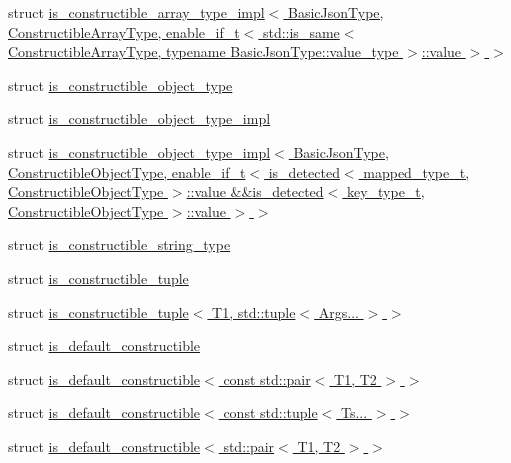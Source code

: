 \begin{DoxyCompactItemize}
\item 
struct \hyperlink{structnlohmann_1_1detail_1_1is__constructible__array__type__impl_3_01BasicJsonType_00_01Construce6fa33688da703b95649da4749cdeb98}{is\+\_\+constructible\+\_\+array\+\_\+type\+\_\+impl$<$ Basic\+Json\+Type, Constructible\+Array\+Type, enable\+\_\+if\+\_\+t$<$ std\+::is\+\_\+same$<$ Constructible\+Array\+Type, typename Basic\+Json\+Type\+::value\+\_\+type $>$\+::value $>$ $>$}
\item 
struct \hyperlink{structnlohmann_1_1detail_1_1is__constructible__object__type}{is\+\_\+constructible\+\_\+object\+\_\+type}
\item 
struct \hyperlink{structnlohmann_1_1detail_1_1is__constructible__object__type__impl}{is\+\_\+constructible\+\_\+object\+\_\+type\+\_\+impl}
\item 
struct \hyperlink{structnlohmann_1_1detail_1_1is__constructible__object__type__impl_3_01BasicJsonType_00_01Construa4d1e16800f2c4963485512ecf18377c}{is\+\_\+constructible\+\_\+object\+\_\+type\+\_\+impl$<$ Basic\+Json\+Type, Constructible\+Object\+Type, enable\+\_\+if\+\_\+t$<$ is\+\_\+detected$<$ mapped\+\_\+type\+\_\+t, Constructible\+Object\+Type $>$\+::value \&\&is\+\_\+detected$<$ key\+\_\+type\+\_\+t, Constructible\+Object\+Type $>$\+::value $>$ $>$}
\item 
struct \hyperlink{structnlohmann_1_1detail_1_1is__constructible__string__type}{is\+\_\+constructible\+\_\+string\+\_\+type}
\item 
struct \hyperlink{structnlohmann_1_1detail_1_1is__constructible__tuple}{is\+\_\+constructible\+\_\+tuple}
\item 
struct \hyperlink{structnlohmann_1_1detail_1_1is__constructible__tuple_3_01T1_00_01std_1_1tuple_3_01Args_8_8_8_01_4_01_4}{is\+\_\+constructible\+\_\+tuple$<$ T1, std\+::tuple$<$ Args... $>$ $>$}
\item 
struct \hyperlink{structnlohmann_1_1detail_1_1is__default__constructible}{is\+\_\+default\+\_\+constructible}
\item 
struct \hyperlink{structnlohmann_1_1detail_1_1is__default__constructible_3_01const_01std_1_1pair_3_01T1_00_01T2_01_4_01_4}{is\+\_\+default\+\_\+constructible$<$ const std\+::pair$<$ T1, T2 $>$ $>$}
\item 
struct \hyperlink{structnlohmann_1_1detail_1_1is__default__constructible_3_01const_01std_1_1tuple_3_01Ts_8_8_8_01_4_01_4}{is\+\_\+default\+\_\+constructible$<$ const std\+::tuple$<$ Ts... $>$ $>$}
\item 
struct \hyperlink{structnlohmann_1_1detail_1_1is__default__constructible_3_01std_1_1pair_3_01T1_00_01T2_01_4_01_4}{is\+\_\+default\+\_\+constructible$<$ std\+::pair$<$ T1, T2 $>$ $>$}

\end{DoxyCompactItemize}
